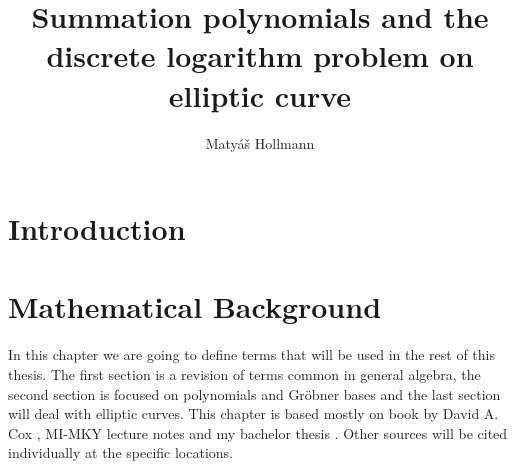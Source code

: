 \documentclass[thesis=M,english]{FITthesis}[2012/10/20]
\title{Summation polynomials and the discrete logarithm problem on elliptic curve}
\author{Matyáš Hollmann} %
\theoremstyle{remark}
\theoremstyle{definition}
\begin{document}

\chapter{Introduction}

\chapter{Mathematical Background}\label{mathBG}
%
 In this chapter we are going to define terms that will be used in the rest of this thesis. The first section is a revision of terms common in general algebra, the second section is focused on polynomials and Gröbner bases and the last section will deal with elliptic curves. This chapter is based mostly on book by David A. Cox \cite{algGeom}, MI-MKY lecture notes \cite{mky} and my bachelor thesis \cite{myBP}. Other sources will be cited individually at the specific locations.
\end{document}
